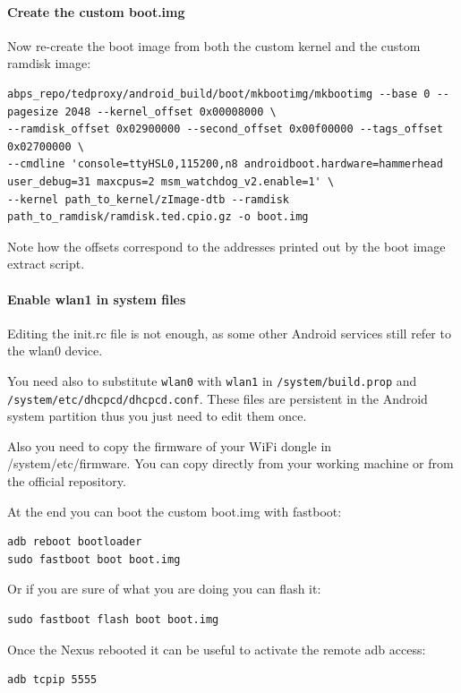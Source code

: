 \documentclass[a4paper]{article}
\begin{document}
 \paragraph{Create the custom boot.img}
Now re-create the boot image from both the custom kernel and the custom ramdisk image:

\begin{lstlisting}
abps_repo/tedproxy/android_build/boot/mkbootimg/mkbootimg --base 0 --pagesize 2048 --kernel_offset 0x00008000 \
--ramdisk_offset 0x02900000 --second_offset 0x00f00000 --tags_offset 0x02700000 \
--cmdline 'console=ttyHSL0,115200,n8 androidboot.hardware=hammerhead user_debug=31 maxcpus=2 msm_watchdog_v2.enable=1' \
--kernel path_to_kernel/zImage-dtb --ramdisk path_to_ramdisk/ramdisk.ted.cpio.gz -o boot.img
\end{lstlisting}

Note how the offsets correspond to the addresses printed out by the boot image extract script.

\paragraph{Enable wlan1 in system files}
Editing the init.rc file is not enough, as some other Android services still refer to the wlan0 device.

You need also to substitute \texttt{wlan0} with \texttt{wlan1} in \texttt{/system/build.prop} and \texttt{/system/etc/dhcpcd/dhcpcd.conf}.
These files are persistent in the Android system partition thus you just need to edit them once.

Also you need to copy the firmware of your WiFi dongle in /system/etc/firmware. You can copy directly from your working machine
 or from the official repository\cite{firmwarerepo}.

At the end you can boot the custom boot.img with fastboot:
	
\begin{lstlisting}
adb reboot bootloader
sudo fastboot boot boot.img
\end{lstlisting}

Or if you are sure of what you are doing you can flash it:

\begin{lstlisting}
sudo fastboot flash boot boot.img
\end{lstlisting}

Once the Nexus rebooted it can be useful to activate the remote adb access:

\begin{lstlisting}
adb tcpip 5555
\end{lstlisting}
\end{document}
